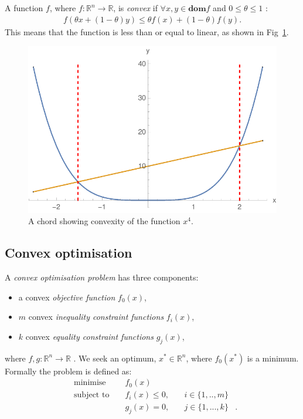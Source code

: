 \documentclass[twocolumn,secnumarabic,amssymb, nobibnotes, aps, prl,superscriptaddress]{revtex4-1}
\begin{document}
A function $f$, where $f:\mathbb{R}^n \rightarrow \mathbb{R}$, is \textit{convex} if $\forall x,y\in \textbf{dom} f$ and $0 \leq \theta \leq 1$ \cite[p.67]{cvxpybook}:
\begin{align}
f(\theta x + (1-\theta)y) \leq \theta f(x)+(1-\theta)f(y).
\end{align}
This means that the function is less than or equal to linear, as shown in Fig~\ref{fig:convex}. %
\begin{figure}[h!]
\includegraphics[width=0.9\linewidth]{convex_function.pdf}
\caption{\label{fig:convex}A chord showing convexity of the function $x^4$.} 
\end{figure}

\subsection{Convex optimisation}
A \textit{convex optimisation problem} has three components:
\begin{itemize}
\item a convex \textit{objective function} $f_0(x)$,
\item $m$ convex \textit{inequality constraint functions} $f_i(x)$,
\item $k$ convex \textit{equality constraint functions} $g_j(x)$, 
\end{itemize}
where $f,g: \mathbb{R}^n \rightarrow \mathbb{R}$ \cite[p.141]{cvxpybook}. We seek an optimum, $x^*\in \mathbb{R}^n$, where $f_0(x^*)$ is a minimum. Formally the problem is defined as:
\begin{align} \label{eq:cvxdefn}
&\text{minimise } && f_0(x) & \nonumber &\\
&\text{subject to } && f_i(x) \leq 0,\quad & i\in \{1,..,m\}\nonumber &\\
& && g_{j}(x)=0,\quad & j\in \{1,...,k\} &.
\end{align}
\end{document}

